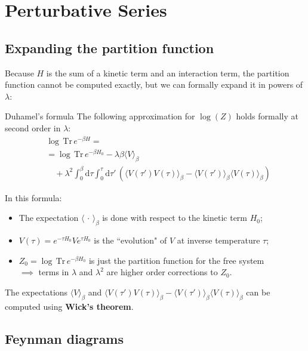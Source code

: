 \documentclass{beamer}
\begin{document}
\section{Perturbative Series}

\subsection{Expanding the partition function}

\begin{frame}
	Because $H$ is the sum of a kinetic term and an interaction term, the partition function
	cannot be computed exactly, but we can formally expand it in powers of $\lambda$:
	\begin{block}{Duhamel's formula}
		The following approximation for $\log(Z)$ holds formally at second order in $\lambda$:
		\begin{align*}
			&\log\,\mathrm{Tr}\,e^{-\beta H}=\\
			&= \log\,\mathrm{Tr}\,e^{-\beta H_0} - \lambda\beta\langle V\rangle_\beta\\
			&\quad+ \lambda^2 \int_0^\beta\mathrm{d}\tau\int_0^\tau\mathrm{d}\tau'\,
			\left(\langle V(\tau')V(\tau)\rangle_\beta - \langle V(\tau')\rangle_\beta\langle V(\tau)\rangle_\beta\right)
		\end{align*}
	\end{block}
\end{frame}

\begin{frame}
	In this formula:
	\begin{itemize}
		\item The expectation $\langle\,\cdot\,\rangle_\beta$ is done with respect to the
			kinetic term $H_0$;
		\item $V(\tau) = e^{-\tau H_0}Ve^{\tau H_0}$ is the ``evolution" of $V$ at inverse
			temperature $\tau$;
		\item $Z_0=\log\,\mathrm{Tr}\,e^{-\beta H_0}$ is just the partition function for the
			free system\\
			$\implies$ terms in $\lambda$ and $\lambda^2$ are higher order corrections to $Z_0$.
	\end{itemize}

	The expectations $\langle V\rangle_\beta$ and $\langle V(\tau')V(\tau)\rangle_\beta
	-\langle V(\tau')\rangle_\beta\langle V(\tau)\rangle_\beta$ can be computed using
	\textbf{Wick's theorem}.
\end{frame}

\subsection{Feynman diagrams}
\end{document}
